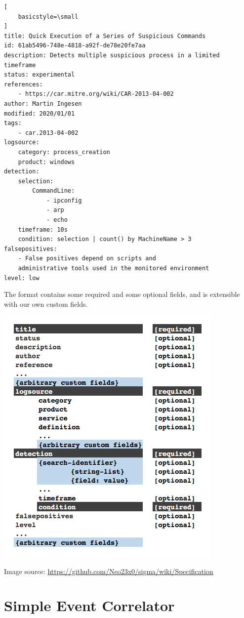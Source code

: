 \begin{lstlisting}[
    basicstyle=\small
]
title: Quick Execution of a Series of Suspicious Commands
id: 61ab5496-748e-4818-a92f-de78e20fe7aa
description: Detects multiple suspicious process in a limited timeframe
status: experimental
references:
    - https://car.mitre.org/wiki/CAR-2013-04-002
author: Martin Ingesen
modified: 2020/01/01
tags:
    - car.2013-04-002
logsource:
    category: process_creation
    product: windows
detection:
    selection:
        CommandLine:
            - ipconfig
            - arp
            - echo
    timeframe: 10s
    condition: selection | count() by MachineName > 3
falsepositives:
    - False positives depend on scripts and
    administrative tools used in the monitored environment
level: low
\end{lstlisting}
The format contains some required and some optional fields, and is extensible with our own custom fields.

\includegraphics[scale=0.525]{figures/new-rule-format/Sigma_Schema.png}

Image source: \url{https://github.com/Neo23x0/sigma/wiki/Specification}

\section{Simple Event Correlator}
\label{sec:SEC}

